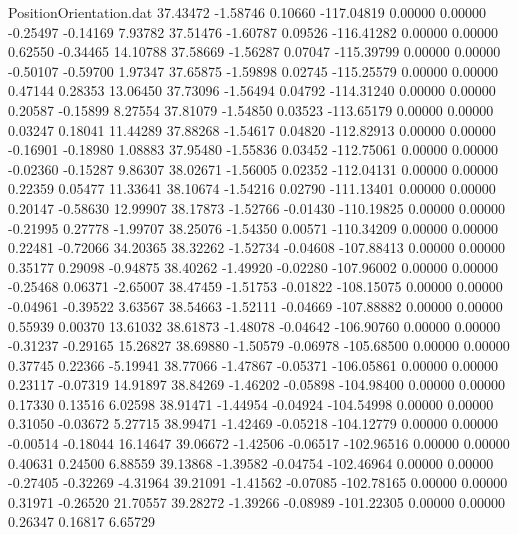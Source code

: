 \begin{filecontents}{PositionOrientation.dat}
  37.43472   -1.58746    0.10660  -117.04819    0.00000    0.00000   -0.25497   -0.14169    7.93782
  37.51476   -1.60787    0.09526  -116.41282    0.00000    0.00000    0.62550   -0.34465   14.10788
  37.58669   -1.56287    0.07047  -115.39799    0.00000    0.00000   -0.50107   -0.59700    1.97347
  37.65875   -1.59898    0.02745  -115.25579    0.00000    0.00000    0.47144    0.28353   13.06450
  37.73096   -1.56494    0.04792  -114.31240    0.00000    0.00000    0.20587   -0.15899    8.27554
  37.81079   -1.54850    0.03523  -113.65179    0.00000    0.00000    0.03247    0.18041   11.44289
  37.88268   -1.54617    0.04820  -112.82913    0.00000    0.00000   -0.16901   -0.18980    1.08883
  37.95480   -1.55836    0.03452  -112.75061    0.00000    0.00000   -0.02360   -0.15287    9.86307
  38.02671   -1.56005    0.02352  -112.04131    0.00000    0.00000    0.22359    0.05477   11.33641
  38.10674   -1.54216    0.02790  -111.13401    0.00000    0.00000    0.20147   -0.58630   12.99907
  38.17873   -1.52766   -0.01430  -110.19825    0.00000    0.00000   -0.21995    0.27778   -1.99707
  38.25076   -1.54350    0.00571  -110.34209    0.00000    0.00000    0.22481   -0.72066   34.20365
  38.32262   -1.52734   -0.04608  -107.88413    0.00000    0.00000    0.35177    0.29098   -0.94875
  38.40262   -1.49920   -0.02280  -107.96002    0.00000    0.00000   -0.25468    0.06371   -2.65007
  38.47459   -1.51753   -0.01822  -108.15075    0.00000    0.00000   -0.04961   -0.39522    3.63567
  38.54663   -1.52111   -0.04669  -107.88882    0.00000    0.00000    0.55939    0.00370   13.61032
  38.61873   -1.48078   -0.04642  -106.90760    0.00000    0.00000   -0.31237   -0.29165   15.26827
  38.69880   -1.50579   -0.06978  -105.68500    0.00000    0.00000    0.37745    0.22366   -5.19941
  38.77066   -1.47867   -0.05371  -106.05861    0.00000    0.00000    0.23117   -0.07319   14.91897
  38.84269   -1.46202   -0.05898  -104.98400    0.00000    0.00000    0.17330    0.13516    6.02598
  38.91471   -1.44954   -0.04924  -104.54998    0.00000    0.00000    0.31050   -0.03672    5.27715
  38.99471   -1.42469   -0.05218  -104.12779    0.00000    0.00000   -0.00514   -0.18044   16.14647
  39.06672   -1.42506   -0.06517  -102.96516    0.00000    0.00000    0.40631    0.24500    6.88559
  39.13868   -1.39582   -0.04754  -102.46964    0.00000    0.00000   -0.27405   -0.32269   -4.31964
  39.21091   -1.41562   -0.07085  -102.78165    0.00000    0.00000    0.31971   -0.26520   21.70557
  39.28272   -1.39266   -0.08989  -101.22305    0.00000    0.00000    0.26347    0.16817    6.65729

\end{filecontents}
